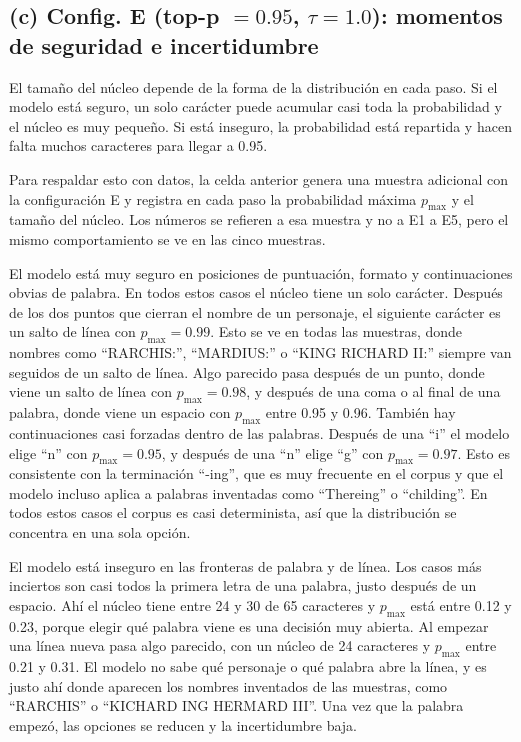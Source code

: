 \documentclass[11pt]{article}
\begin{document}
\subsection*{(c) Config. E (top-p $=0.95$, $\tau=1.0$): momentos de seguridad e incertidumbre}
El tamaño del núcleo depende de la forma de la distribución en cada paso. Si el modelo está seguro, un solo carácter puede acumular casi toda la probabilidad y el núcleo es muy pequeño. Si está inseguro, la probabilidad está repartida y hacen falta muchos caracteres para llegar a 0.95.

Para respaldar esto con datos, la celda anterior genera una muestra adicional con la configuración E y registra en cada paso la probabilidad máxima \(p_{\max}\) y el tamaño del núcleo. Los números se refieren a esa muestra y no a E1 a E5, pero el mismo comportamiento se ve en las cinco muestras.

El modelo está muy seguro en posiciones de puntuación, formato y continuaciones obvias de palabra. En todos estos casos el núcleo tiene un solo carácter. Después de los dos puntos que cierran el nombre de un personaje, el siguiente carácter es un salto de línea con \(p_{\max}=0.99\). Esto se ve en todas las muestras, donde nombres como ``RARCHIS:'', ``MARDIUS:'' o ``KING RICHARD II:'' siempre van seguidos de un salto de línea. Algo parecido pasa después de un punto, donde viene un salto de línea con \(p_{\max}=0.98\), y después de una coma o al final de una palabra, donde viene un espacio con \(p_{\max}\) entre 0.95 y 0.96. También hay continuaciones casi forzadas dentro de las palabras. Después de una ``i'' el modelo elige ``n'' con \(p_{\max}=0.95\), y después de una ``n'' elige ``g'' con \(p_{\max}=0.97\). Esto es consistente con la terminación ``-ing'', que es muy frecuente en el corpus y que el modelo incluso aplica a palabras inventadas como ``Thereing'' o ``childing''. En todos estos casos el corpus es casi determinista, así que la distribución se concentra en una sola opción.

El modelo está inseguro en las fronteras de palabra y de línea. Los casos más inciertos son casi todos la primera letra de una palabra, justo después de un espacio. Ahí el núcleo tiene entre 24 y 30 de 65 caracteres y \(p_{\max}\) está entre 0.12 y 0.23, porque elegir qué palabra viene es una decisión muy abierta. Al empezar una línea nueva pasa algo parecido, con un núcleo de 24 caracteres y \(p_{\max}\) entre 0.21 y 0.31. El modelo no sabe qué personaje o qué palabra abre la línea, y es justo ahí donde aparecen los nombres inventados de las muestras, como ``RARCHIS'' o ``KICHARD ING HERMARD III''. Una vez que la palabra empezó, las opciones se reducen y la incertidumbre baja.
\end{document}
